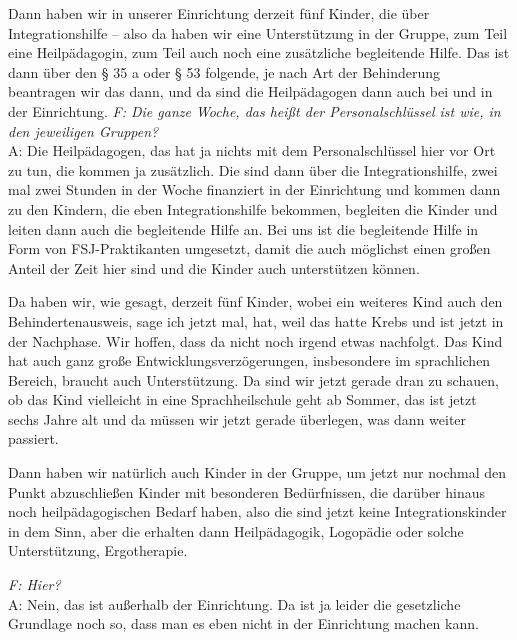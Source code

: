 \begin{linenumbers*}
Dann haben wir in unserer Einrichtung derzeit fünf Kinder, die über Integrationshilfe -- also da haben wir eine Unterstützung in der Gruppe, zum Teil eine Heilpädagogin, zum Teil auch noch eine zusätzliche begleitende Hilfe. Das ist dann über den § 35 a oder § 53 folgende, je nach Art der Behinderung beantragen wir das dann, und da sind die Heilpädagogen dann auch bei und in der Einrichtung.
\emph{F: Die ganze Woche, das heißt der Personalschlüssel ist wie, in den jeweiligen Gruppen?}\\
A: Die Heilpädagogen, das hat ja nichts mit dem Personalschlüssel hier vor Ort zu tun, die kommen ja zusätzlich. Die sind dann über die Integrationshilfe, zwei mal zwei Stunden in der Woche finanziert in der Einrichtung und kommen dann zu den Kindern, die eben Integrationshilfe bekommen, begleiten die Kinder und leiten dann auch die begleitende Hilfe an. Bei uns ist die begleitende Hilfe in Form von FSJ-Praktikanten umgesetzt, damit die auch möglichst einen großen Anteil der Zeit hier sind und die Kinder auch unterstützen können.  

Da haben wir, wie gesagt, derzeit fünf Kinder, wobei ein weiteres Kind auch den Behindertenausweis, sage ich jetzt mal, hat, weil das hatte Krebs und ist jetzt in der Nachphase. Wir hoffen, dass da nicht noch irgend etwas nachfolgt. Das Kind hat auch ganz große Entwicklungsverzögerungen, insbesondere im sprachlichen Bereich, braucht auch Unterstützung. Da sind wir jetzt gerade dran zu schauen, ob das Kind vielleicht in eine Sprachheilschule geht ab Sommer, das ist jetzt sechs Jahre alt und da müssen wir jetzt gerade überlegen, was dann weiter passiert.

Dann haben wir natürlich auch Kinder in der Gruppe, um jetzt nur nochmal den Punkt abzuschließen Kinder mit besonderen Bedürfnissen, die darüber hinaus noch heilpädagogischen Bedarf haben, also die sind jetzt keine Integrationskinder in dem Sinn, aber die erhalten dann Heilpädagogik, Logopädie oder solche Unterstützung, Ergotherapie.

\emph{F: Hier?}\\
A: Nein, das ist außerhalb der Einrichtung. Da ist ja leider die gesetzliche Grundlage noch so, dass man es eben nicht in der Einrichtung machen kann. 


\end{linenumbers*}
